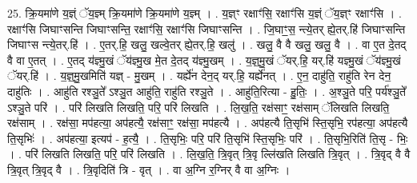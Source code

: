 \documentclass[17pt]{extarticle}
\begin{document}
25. क्रि॒यमा॑णे य॒ज्ञ्ं ॅय॒ज्ञ्म् क्रि॒यमा॑णे क्रि॒यमा॑णे य॒ज्ञ्म् । . य॒ज्ञ्ꣳ रक्षाꣳ॑सि॒ रक्षाꣳ॑सि य॒ज्ञ्ं ॅय॒ज्ञ्ꣳ रक्षाꣳ॑सि । . रक्षाꣳ॑सि जिघाꣳसन्ति जिघाꣳसन्ति॒ रक्षाꣳ॑सि॒ रक्षाꣳ॑सि जिघाꣳसन्ति । . जि॒घाꣳ॒॒स॒ न्त्ये॒तर् ह्ये॒तर्.हि॑ जिघाꣳसन्ति जिघाꣳस न्त्ये॒तर्.हि॑ । . ए॒तर्.हि॒ खलु॒ खल्वे॒तर् ह्ये॒तर्.हि॒ खलु॑ । . खलु॒ वै वै खलु॒ खलु॒ वै । . वा ए॒त दे॒तद् वै वा ए॒तत् । . ए॒तद् य॑ज्ञ्मु॒खं ॅय॑ज्ञ्मु॒ख मे॒त दे॒तद् य॑ज्ञ्मु॒खम् । . य॒ज्ञ्॒मु॒खं ॅयर्.हि॒ यर्.हि॑ यज्ञ्मु॒खं ॅय॑ज्ञ्मु॒खं ॅयर्.हि॑ । . य॒ज्ञ्॒मु॒खमिति॑ यज्ञ् - मु॒खम् । . यर्ह्ये॑न देन॒द् यर्.हि॒ यर्ह्ये॑नत् । . ए॒न॒ दाहु॑ति॒ राहु॑ति रेन देन॒ दाहु॑तिः । . आहु॑ति रश्ञु॒ते᳚ ऽश्ञु॒त आहु॑ति॒ राहु॑ति रश्ञु॒ते । . आहु॑ति॒रित्या - हु॒तिः॒ । . अ॒श्ञु॒ते परि॒ पर्य॑श्ञु॒ते᳚ ऽश्ञु॒ते परि॑ । . परि॑ लिखति लिखति॒ परि॒ परि॑ लिखति । . लि॒ख॒ति॒ रक्ष॑साꣳ॒॒ रक्ष॑साम् ॅलिखति लिखति॒ रक्ष॑साम् । . रक्ष॑सा॒ मप॑हत्या॒ अप॑हत्यै॒ रक्ष॑साꣳ॒॒ रक्ष॑सा॒ मप॑हत्यै । . अप॑हत्यै ति॒सृभि॑ स्ति॒सृभि॒ रप॑हत्या॒ अप॑हत्यै ति॒सृभिः॑ । . अप॑हत्या॒ इत्यप॑ - ह॒त्यै॒ । . ति॒सृभिः॒ परि॒ परि॑ ति॒सृभि॑ स्ति॒सृभिः॒ परि॑ । . ति॒सृभि॒रिति॑ ति॒सृ - भिः॒ । . परि॑ लिखति लिखति॒ परि॒ परि॑ लिखति । . लि॒ख॒ति॒ त्रि॒वृत् त्रि॒वृ ल्लि॑खति लिखति त्रि॒वृत् । . त्रि॒वृद् वै वै त्रि॒वृत् त्रि॒वृद् वै । . त्रि॒वृदिति॑ त्रि - वृत् । . वा अ॒ग्नि र॒ग्निर् वै वा अ॒ग्निः । \newline
\end{document}
